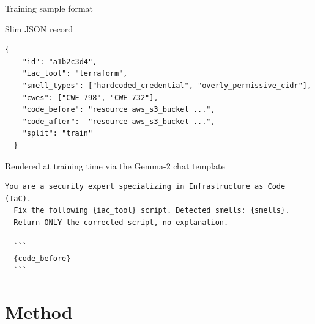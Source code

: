 \documentclass[aspectratio=169, 10pt]{beamer}
\begin{document}
\begin{frame}[fragile]{Training sample format}
  \begin{block}{Slim JSON record}
  \begin{lstlisting}[basicstyle=\ttfamily\scriptsize]
  {
    "id": "a1b2c3d4",
    "iac_tool": "terraform",
    "smell_types": ["hardcoded_credential", "overly_permissive_cidr"],
    "cwes": ["CWE-798", "CWE-732"],
    "code_before": "resource aws_s3_bucket ...",
    "code_after":  "resource aws_s3_bucket ...",
    "split": "train"
  }
  \end{lstlisting}
  \end{block}
  \begin{exampleblock}{Rendered at training time via the Gemma-2 chat template}
  \begin{lstlisting}[basicstyle=\ttfamily\scriptsize]
  You are a security expert specializing in Infrastructure as Code (IaC).
  Fix the following {iac_tool} script. Detected smells: {smells}.
  Return ONLY the corrected script, no explanation.

  ```
  {code_before}
  ```
  \end{lstlisting}
  \end{exampleblock}
\end{frame}

\section{Method}
\end{document}
